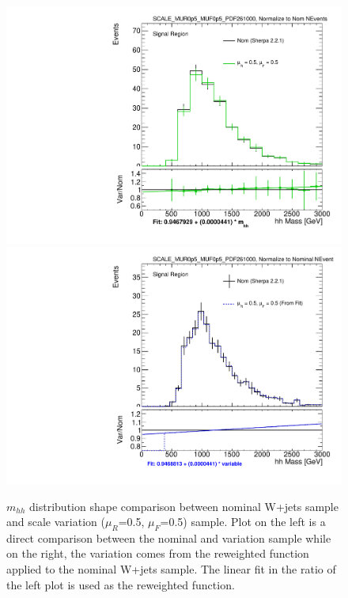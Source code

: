\begin{figure}[!htbp]
\begin{center}
\includegraphics[scale=0.33]{./figures/boosted/systematics/wjets_alt_hhMass_SR_syst_SCALE_MUR0p5_MUF0p5_PDF261000}
\includegraphics[scale=0.33]{./figures/boosted/systematics/wjets_fromfit_hhMass_SR_SCALE_MUR0p5_MUF0p5_PDF261000} \\
\caption{$m_{hh}$ distribution shape comparison between nominal W+jets sample and scale variation ($\mu_{R}$=0.5, $\mu_{F}$=0.5) sample. Plot on the left is a direct
comparison between the nominal and variation sample while on the right, the variation comes from the reweighted function applied to the nominal W+jets sample. The linear fit
in the ratio of the left plot is used as the reweighted function.}
\label{fig:boosted_unc_wjets_sr_scale_fit}
\end{center}
\end{figure}
 
